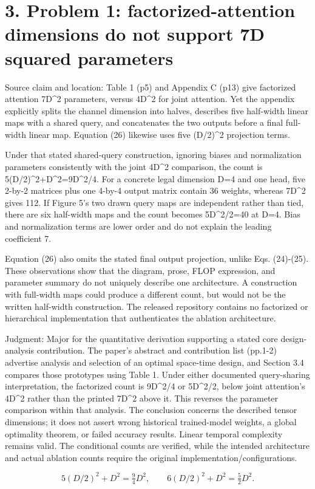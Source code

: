 \documentclass[10pt]{article}
\begin{document}
\section*{3. Problem 1: factorized-attention dimensions do not support 7D squared parameters}
Source claim and location: Table 1 (p5) and Appendix C (p13) give factorized attention 7D\textasciicircum{}2 parameters, versus 4D\textasciicircum{}2 for joint attention. Yet the appendix explicitly splits the channel dimension into halves, describes five half-width linear maps with a shared query, and concatenates the two outputs before a final full-width linear map. Equation (26) likewise uses five (D/2)\textasciicircum{}2 projection terms.\par
Under that stated shared-query construction, ignoring biases and normalization parameters consistently with the joint 4D\textasciicircum{}2 comparison, the count is 5(D/2)\textasciicircum{}2+D\textasciicircum{}2=9D\textasciicircum{}2/4. For a concrete legal dimension D=4 and one head, five 2-by-2 matrices plus one 4-by-4 output matrix contain 36 weights, whereas 7D\textasciicircum{}2 gives 112. If Figure 5’s two drawn query maps are independent rather than tied, there are six half-width maps and the count becomes 5D\textasciicircum{}2/2=40 at D=4. Bias and normalization terms are lower order and do not explain the leading coefficient 7.\par
Equation (26) also omits the stated final output projection, unlike Eqs. (24)-(25). These observations show that the diagram, prose, FLOP expression, and parameter summary do not uniquely describe one architecture. A construction with full-width maps could produce a different count, but would not be the written half-width construction. The released repository contains no factorized or hierarchical implementation that authenticates the ablation architecture.\par
Judgment: Major for the quantitative derivation supporting a stated core design-analysis contribution. The paper’s abstract and contribution list (pp.1-2) advertise analysis and selection of an optimal space-time design, and Section 3.4 compares those prototypes using Table 1. Under either documented query-sharing interpretation, the factorized count is 9D\textasciicircum{}2/4 or 5D\textasciicircum{}2/2, below joint attention’s 4D\textasciicircum{}2 rather than the printed 7D\textasciicircum{}2 above it. This reverses the parameter comparison within that analysis. The conclusion concerns the described tensor dimensions; it does not assert wrong historical trained-model weights, a global optimality theorem, or failed accuracy results. Linear temporal complexity remains valid. The conditional counts are verified, while the intended architecture and actual ablation counts require the original implementation/configurations.\par
\[5(D/2)^2+D^2=\tfrac94D^2,\qquad 6(D/2)^2+D^2=\tfrac52D^2.\]\par
\end{document}
